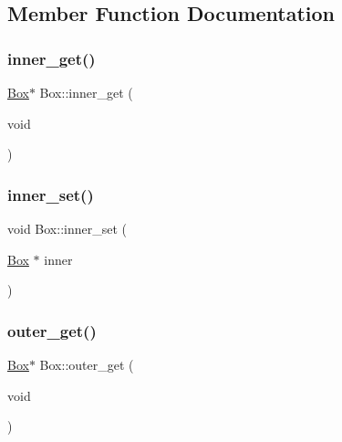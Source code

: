 \subsection{Member Function Documentation}
\mbox{\label{classBox_a4c90479b80ff40afefefd7b65696ca25}} 
\subsubsection{\texorpdfstring{inner\+\_\+get()}{inner\_get()}}
{\footnotesize\ttfamily \mbox{\hyperlink{classBox}{Box}}$\ast$ Box\+::inner\+\_\+get (\begin{DoxyParamCaption}\item[{void}]{ }\end{DoxyParamCaption})}

\mbox{\label{classBox_ad2c07980042476c14d1ed072ff7fe6ef}} 
\subsubsection{\texorpdfstring{inner\+\_\+set()}{inner\_set()}}
{\footnotesize\ttfamily void Box\+::inner\+\_\+set (\begin{DoxyParamCaption}\item[{\mbox{\hyperlink{classBox}{Box}} $\ast$}]{inner }\end{DoxyParamCaption})}

\mbox{\label{classBox_ac4510baf549bd4801a09e4c2541f761d}} 
\subsubsection{\texorpdfstring{outer\+\_\+get()}{outer\_get()}}
{\footnotesize\ttfamily \mbox{\hyperlink{classBox}{Box}}$\ast$ Box\+::outer\+\_\+get (\begin{DoxyParamCaption}\item[{void}]{ }\end{DoxyParamCaption})}

\mbox{\label{classBox_a58ddc8fee18ace5fac0ee445e8011881}} 
